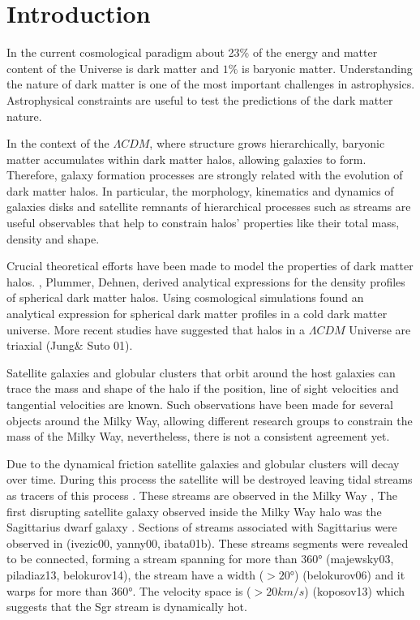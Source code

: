 \label{sec:intro}
\section{Introduction}

In the current cosmological paradigm about 23\% of the energy and matter
content of the Universe is dark matter and $1\%$ is baryonic matter.
Understanding the nature of dark matter is one of the most important challenges in
astrophysics. Astrophysical constraints are useful to test the predictions
of the dark matter nature. %

In the context of the $\Lambda CDM$, where structure grows hierarchically, baryonic matter
accumulates within dark matter halos, allowing galaxies to form.
Therefore, galaxy formation processes are strongly related with the evolution of dark
matter halos. In particular, the morphology, kinematics and dynamics of galaxies
disks and satellite remnants of hierarchical processes
such as streams are useful observables that help to constrain halos'
properties like their total mass, density and shape.

Crucial theoretical efforts have been made to model the properties of dark
matter halos. \citep{Hernquist90}, Plummer, Dehnen, derived analytical expressions for
the density profiles of spherical dark matter halos. Using cosmological
simulations \citep{Navarro96, Navarro97} found an analytical expression for spherical
dark matter profiles in a cold dark matter universe. More recent studies have
suggested that halos in a $\Lambda CDM$ Universe are triaxial (Jung\& Suto 01).

Satellite galaxies and globular clusters that orbit around the host
galaxies can trace the mass and shape of the halo if the position, line of
sight velocities and tangential velocities are known. Such observations
have been made for several objects around the Milky Way, allowing different
research groups to constrain the mass of the Milky Way, nevertheless, there is not a consistent
agreement yet. %

Due to the dynamical friction satellite galaxies and globular clusters
will decay over time. During this process the satellite will be
destroyed leaving tidal streams as tracers of this process
\citep{Toomre72, LyndenBell95, Johnston96}. These streams are observed in the Milky Way
, The first disrupting satellite galaxy observed inside the Milky Way halo was the Sagittarius dwarf
galaxy \citep{Ibata94}. Sections of streams associated with Sagittarius were
observed in (ivezic00, yanny00, ibata01b).
These streams segments were revealed to be connected, forming a stream
spanning for more than $360°$ (majewsky03, piladiaz13, belokurov14), the stream have a width ($>20°$) (belokurov06) and it warps
for more than $360°$. The velocity space is ($>20km/s$) (koposov13)
which suggests that
the Sgr stream is dynamically hot.

